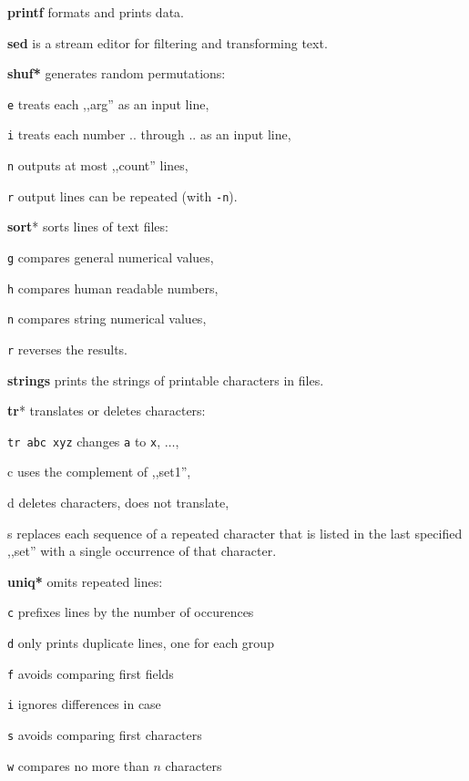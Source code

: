 \textbf{printf} formats and prints data.

\textbf{sed} is a stream editor for filtering and transforming text.

\textbf{shuf*} generates random permutations:
\begin{enumx}
	\item [\texttt{e}] treats each ,,arg'' as an input line,
	\item [\texttt{i}] treats each number .. through .. as an input line, 
	\item [\texttt{n}] outputs at most ,,count'' lines,
	\item [\texttt{r}] output lines can be repeated (with \texttt{-n}).
\end{enumx}

\textbf{sort}* sorts lines of text files:
\begin{enumx}
	\item [\texttt{g}] compares general numerical values,
	\item [\texttt{h}] compares human readable numbers,
	\item [\texttt{n}] compares string numerical values,
	\item [\texttt{r}] reverses the results.
\end{enumx}

\textbf{strings} prints the strings of printable characters in files.

\textbf{tr}* translates or deletes characters:
\begin{enumx}
	\item \texttt{tr abc xyz} changes \texttt{a} to \texttt{x}, $\ldots$,
	\item [c] uses the complement of ,,set1'',
	\item [d] deletes characters, does not translate,
	\item [s] replaces each sequence of a repeated character that is listed 
	in the last specified ,,set'' with a single occurrence of that character.
\end{enumx}

\textbf{uniq*} omits repeated lines:
\begin{enumx}
	\item [\texttt{c}] prefixes lines by the number of occurences
	\item [\texttt{d}] only prints duplicate lines, one for each group
	\item [\texttt{f}] avoids comparing first fields
	\item [\texttt{i}] ignores differences in case
	\item [\texttt{s}] avoids comparing first characters
	\item [\texttt{w}] compares no more than $n$ characters
\end{enumx}

